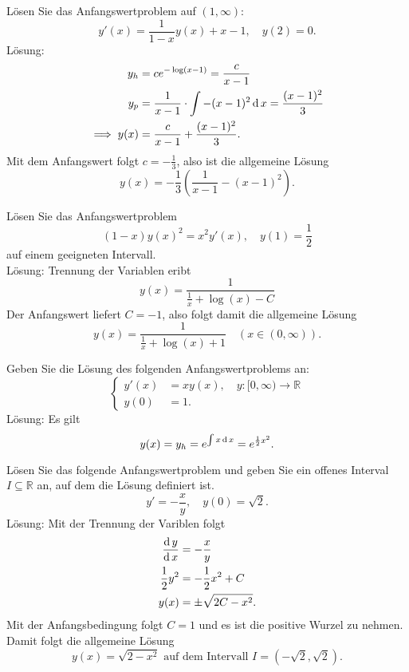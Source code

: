 \documentclass[parskip=full]{scrartcl}
\begin{document}
Lösen Sie das Anfangswertproblem auf $(1, \infty)$:
\begin{displaymath}
  y'(x) = \frac{1}{1 - x} y(x) + x - 1, \quad y(2) = 0.
\end{displaymath}
Lösung:
\begin{align*}
  y_h &= ce^{- \log(x - 1)} = \frac{c}{x - 1}\\
  y_p &= \frac{1}{x - 1} \cdot \int -(x - 1)^2 \operatorname{\mathop{}\!\mathrm{d}} x = \frac{(x - 1)^2}{3}\\
  \implies y(x) &= \frac{c}{x - 1} + \frac{(x-1)^2}{3}.
\end{align*}
Mit dem Anfangswert folgt $c = -\frac{1}{3}$, also ist die allgemeine Lösung
\begin{displaymath}
  y(x) = -\frac{1}{3}\left(\frac{1}{x - 1} - (x - 1)^2\right).
\end{displaymath}

Lösen Sie das Anfangswertproblem
\begin{displaymath}
  (1 - x)y(x)^2 = x^2 y'(x), \quad y(1) = \frac{1}{2}
\end{displaymath}
auf einem geeigneten Intervall.\\
Lösung: Trennung der Variablen eribt
\begin{displaymath}
  y(x) = \frac{1}{\frac{1}{x} + \log(x) - C}
\end{displaymath}
Der Anfangswert liefert $C = -1$, also folgt damit die allgemeine Lösung
\begin{displaymath}
  y(x) = \frac{1}{\frac{1}{x} + \log(x) + 1} \quad (x \in (0, \infty)).
\end{displaymath}

Geben Sie die Lösung des folgenden Anfangswertproblems an:
\begin{displaymath}
  \begin{cases}
    y'(x) &= xy(x), \quad y : [0,\infty) \to \mathbb{R}\\
    y(0) &= 1.
  \end{cases}
\end{displaymath}
Lösung:
Es gilt
\begin{displaymath}
  y(x) = y_h = e^{\int x \operatorname{\mathop{}\!\mathrm{d}} x} = e^{\frac{1}{2} x^2}.  
\end{displaymath}

Lösen Sie das folgende Anfangswertproblem und geben Sie ein offenes Interval $I \subseteq \mathbb{R}$ an, auf dem die Lösung definiert ist.
\begin{displaymath}
  y' = -\frac{x}{y}, \quad y(0) = \sqrt{2}.
\end{displaymath}
Lösung:
Mit der Trennung der Variblen folgt
\begin{align*}
  \frac{\operatorname{\mathop{}\!\mathrm{d}} y}{\operatorname{\mathop{}\!\mathrm{d}} x} &= -\frac{x}{y}\\
  \frac{1}{2}y^2 &= -\frac{1}{2} x^2 + C\\
  y(x) &= \pm \sqrt{2C - x^2}.
\end{align*}
Mit der Anfangsbedingung folgt $C = 1$ und es ist die positive Wurzel zu nehmen.
Damit folgt die allgemeine Lösung
\begin{displaymath}
  y(x) = \sqrt{2 - x^2} \text{ auf dem Intervall } I = (-\sqrt{2}, \sqrt{2}).
\end{displaymath}
\end{document}
